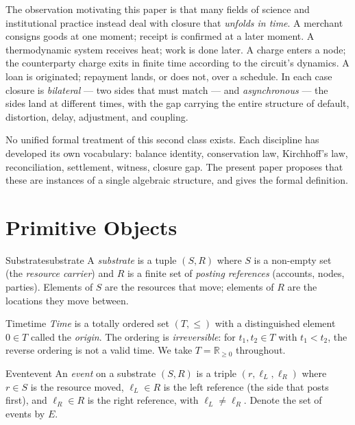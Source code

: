 \documentclass[11pt]{article}
\begin{document}
The observation motivating this paper is that many fields of science and institutional practice instead deal with closure that \emph{unfolds in time}. A merchant consigns goods at one moment; receipt is confirmed at a later moment. A thermodynamic system receives heat; work is done later. A charge enters a node; the counterparty charge exits in finite time according to the circuit's dynamics. A loan is originated; repayment lands, or does not, over a schedule. In each case closure is \emph{bilateral} — two sides that must match — and \emph{asynchronous} — the sides land at different times, with the gap carrying the entire structure of default, distortion, delay, adjustment, and coupling.

No unified formal treatment of this second class exists. Each discipline has developed its own vocabulary: balance identity, conservation law, Kirchhoff's law, reconciliation, settlement, witness, closure gap. The present paper proposes that these are instances of a single algebraic structure, and gives the formal definition.

\section{Primitive Objects}

\begin{defnBOX}{Substrate}{substrate}
A \emph{substrate} is a tuple $(S, R)$ where $S$ is a non-empty set (the \emph{resource carrier}) and $R$ is a finite set of \emph{posting references} (accounts, nodes, parties). Elements of $S$ are the resources that move; elements of $R$ are the locations they move between.
\end{defnBOX}

\begin{defnBOX}{Time}{time}
\emph{Time} is a totally ordered set $(T, \leq)$ with a distinguished element $0 \in T$ called the \emph{origin}. The ordering is \emph{irreversible}: for $t_1, t_2 \in T$ with $t_1 < t_2$, the reverse ordering is not a valid time. We take $T = \mathbb{R}_{\geq 0}$ throughout.
\end{defnBOX}

\begin{defnBOX}{Event}{event}
An \emph{event} on a substrate $(S, R)$ is a triple $(r, \ell_L, \ell_R)$ where $r \in S$ is the resource moved, $\ell_L \in R$ is the left reference (the side that posts first), and $\ell_R \in R$ is the right reference, with $\ell_L \neq \ell_R$. Denote the set of events by $E$.
\end{defnBOX}
\end{document}
